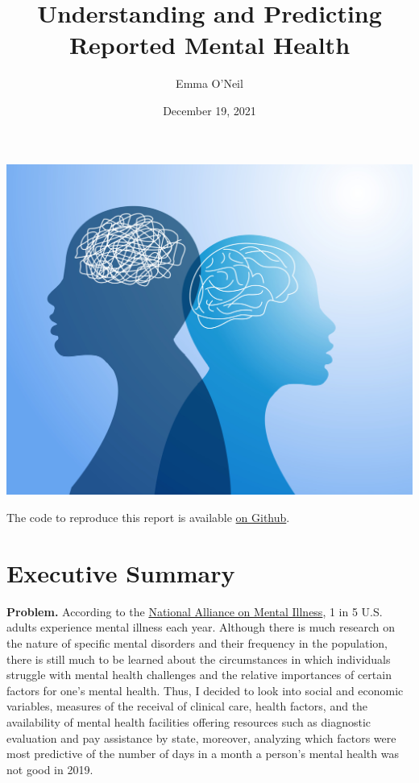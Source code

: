 \documentclass[
]{article}
\title{Understanding and Predicting Reported Mental Health}
\author{Emma O'Neil}
\date{December 19, 2021}
\begin{document}
\maketitle

\includegraphics{minds-vector-image.jpg}
\newpage
\hypersetup{linkcolor=black}
\tableofcontents

\bigskip

The code to reproduce this report is available \href{https://github.com/emoneil/final-project}{on Github}.

\newpage

\hypertarget{executive-summary}{%
\section{Executive Summary}\label{executive-summary}}

\textbf{Problem.} According to the \href{https://www.nami.org/mhstats}{National Alliance on Mental Illness}, 1 in 5 U.S. adults experience mental illness each year. Although there is much research on the nature of specific mental disorders and their frequency in the population, there is still much to be learned about the circumstances in which individuals struggle with mental health challenges and the relative importances of certain factors for one's mental health. Thus, I decided to look into social and economic variables, measures of the receival of clinical care, health factors, and the availability of mental health facilities offering resources such as diagnostic evaluation and pay assistance by state, moreover, analyzing which factors were most predictive of the number of days in a month a person's mental health was not good in 2019.
\end{document}
